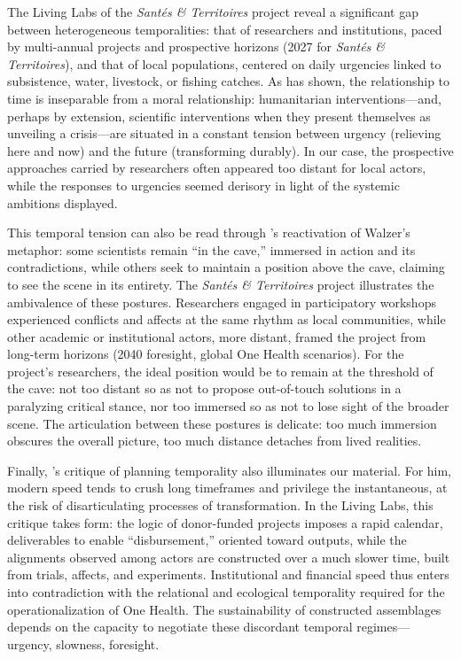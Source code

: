 \documentclass{article}
\begin{document}
The Living Labs of the \textit{Santés \& Territoires} project reveal a significant gap between heterogeneous temporalities: that of researchers and institutions, paced by multi-annual projects and prospective horizons (2027 for \textit{Santés \& Territoires}), and that of local populations, centered on daily urgencies linked to subsistence, water, livestock, or fishing catches. As \textcite{fassin_raison_2010} has shown, the relationship to time is inseparable from a moral relationship: humanitarian interventions—and, perhaps by extension, scientific interventions when they present themselves as unveiling a crisis—are situated in a constant tension between urgency (relieving here and now) and the future (transforming durably). In our case, the prospective approaches carried by researchers often appeared too distant for local actors, while the responses to urgencies seemed derisory in light of the systemic ambitions displayed.  

This temporal tension can also be read through \textcite{fassin_science_2009}’s reactivation of Walzer’s metaphor: some scientists remain “in the cave,” immersed in action and its contradictions, while others seek to maintain a position above the cave, claiming to see the scene in its entirety. The \textit{Santés \& Territoires} project illustrates the ambivalence of these postures. Researchers engaged in participatory workshops experienced conflicts and affects at the same rhythm as local communities, while other academic or institutional actors, more distant, framed the project from long-term horizons (2040 foresight, global One Health scenarios). For the project’s researchers, the ideal position would be to remain at the threshold of the cave: not too distant so as not to propose out-of-touch solutions in a paralyzing critical stance, nor too immersed so as not to lose sight of the broader scene. The articulation between these postures is delicate: too much immersion obscures the overall picture, too much distance detaches from lived realities.  

Finally, \textcite{virilio_fin_2023}’s critique of planning temporality also illuminates our material. For him, modern speed tends to crush long timeframes and privilege the instantaneous, at the risk of disarticulating processes of transformation. In the Living Labs, this critique takes form: the logic of donor-funded projects imposes a rapid calendar, deliverables to enable “disbursement,” oriented toward outputs, while the alignments observed among actors are constructed over a much slower time, built from trials, affects, and experiments. Institutional and financial speed thus enters into contradiction with the relational and ecological temporality required for the operationalization of One Health. The sustainability of constructed assemblages depends on the capacity to negotiate these discordant temporal regimes—urgency, slowness, foresight.  
\end{document}
